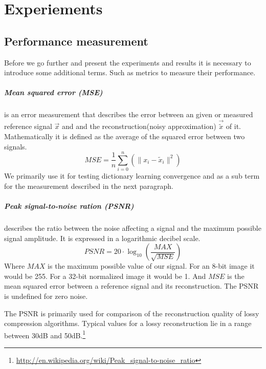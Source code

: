 \chapter{Experiements}

\section{Performance measurement}
Before we go further and present the experiments and results it is necessary to
introduce some additional terms. Such as metrics to measure their performance.

\paragraph{Mean squared error (MSE)} is an error measurement that
describes the error between an given or measured reference signal $\vec{x}$
and and the reconstruction(noisy approximation) $\vec{\tilde{x}}$ of it.
Mathematically it is defined as the average of the squared error between two
signals.
\begin{equation*}
 MSE = \frac{1}{n} \sum_{i=0}^{n} \left( {\lVert x_i -
\tilde{x}_i\rVert^{2}}\right)
\end{equation*}
We primarily use it for testing dictionary learning convergence and as a
sub term for the measurement described in the next paragraph.

\paragraph{Peak signal-to-noise ration (PSNR)} describes the ratio between the
noise affecting a signal and the maximum possible signal amplitude. It is
expressed in a logarithmic decibel scale.
\begin{equation*}
 PSNR = 20 \cdot \log_{10} \left(\frac{MAX}{\sqrt{MSE}}\right)
\end{equation*}
Where $MAX$ is the maximum possible value of our signal. For an 8-bit
image it would be 255. For a 32-bit normalized image it would be 1. And $MSE$ is
the mean squared error between a reference signal and its reconstruction. The
PSNR is undefined for zero noise.

The PSNR is primarily used for comparison of the reconstruction quality of
lossy compression algorithms. Typical values for a lossy reconstruction lie in
a range between 30dB and
50dB.\footnote{\url{http://en.wikipedia.org/wiki/Peak_signal-to-noise_ratio}}

